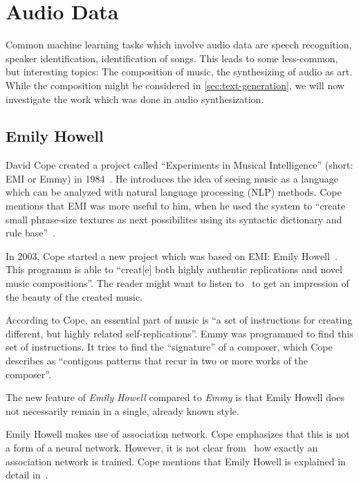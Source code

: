 
\section{Audio Data}
\label{sec:music}

Common machine learning tasks which involve audio data are speech recognition,
speaker identification, identification of songs. This leads to some
less-common, but interesting topics: The composition of music, the synthesizing
of audio as art. While the composition might be considered in
\cref{sec:text-generation}, we will now investigate the work which was done in
audio synthesization.


\subsection{Emily Howell}
David Cope created a project called \enquote{Experiments in Musical
Intelligence} (short: EMI or Emmy) in 1984~\cite{Cope1987}. He introduces the idea of
seeing music as a language which can be analyzed with natural language
processing (NLP) methods. Cope mentions that EMI was more useful to him, when
he used the system to \enquote{create small phrase-size textures as next
possibilites using its syntactic dictionary and rule base}~\cite{Cope1987}.

In 2003, Cope started a new project which was based on EMI: Emily
Howell~\cite{cope2013well}. This programm is able to \enquote{creat[e] both
highly authentic replications and novel music compositions}. The reader might
want to listen to~\cite{Cope2012} to get an impression of the beauty of the
created music.

According to Cope, an essential part of music is \enquote{a set of instructions
for creating different, but highly related self-replications}. Emmy was
programmed to find this set of instructions. It tries to find the
\enquote{signature} of a composer, which Cope describes as \enquote{contigous
patterns that recur in two or more works of the composer}.

The new feature of \textit{Emily Howell} compared to \textit{Emmy} is that
Emily Howell does not necessarily remain in a single, already known style.

Emily Howell makes use of association network. Cope emphasizes that this is not
a form of a neural network. However, it is not clear from~\cite{cope2013well}
how exactly an association network is trained. Cope mentions that Emily
Howell is explained in detail in~\cite{cope2005computer}.


